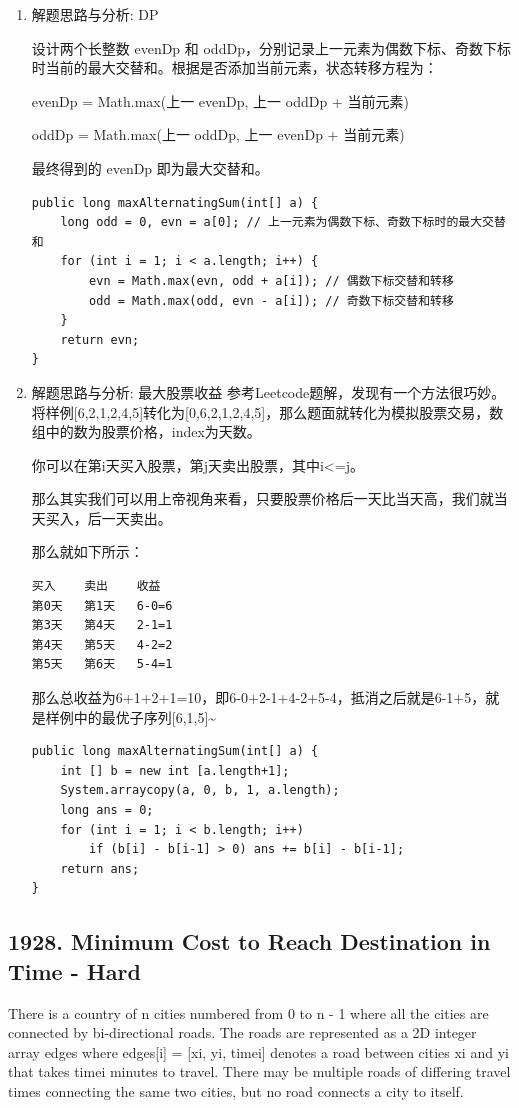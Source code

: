 \documentclass[9pt, b5paaper]{book}
\begin{document}
\begin{enumerate}
\item 解题思路与分析: DP
\label{sec-1-4-9-1}

设计两个长整数 evenDp 和 oddDp，分别记录上一元素为偶数下标、奇数下标时当前的最大交替和。根据是否添加当前元素，状态转移方程为：

evenDp = Math.max(上一 evenDp, 上一 oddDp + 当前元素)

oddDp = Math.max(上一 oddDp, 上一 evenDp + 当前元素)

最终得到的 evenDp 即为最大交替和。

\begin{verbatim}
public long maxAlternatingSum(int[] a) {
    long odd = 0, evn = a[0]; // 上一元素为偶数下标、奇数下标时的最大交替和
    for (int i = 1; i < a.length; i++) {
        evn = Math.max(evn, odd + a[i]); // 偶数下标交替和转移
        odd = Math.max(odd, evn - a[i]); // 奇数下标交替和转移
    }
    return evn;
}
\end{verbatim}
\item 解题思路与分析: 最大股票收益
\label{sec-1-4-9-2}
参考Leetcode题解，发现有一个方法很巧妙。将样例[6,2,1,2,4,5]转化为[0,6,2,1,2,4,5]，那么题面就转化为模拟股票交易，数组中的数为股票价格，index为天数。

你可以在第i天买入股票，第j天卖出股票，其中i<=j。

那么其实我们可以用上帝视角来看，只要股票价格后一天比当天高，我们就当天买入，后一天卖出。

那么就如下所示：
\begin{verbatim}
买入    卖出    收益
第0天   第1天   6-0=6
第3天   第4天   2-1=1
第4天   第5天   4-2=2
第5天   第6天   5-4=1
\end{verbatim}

那么总收益为6+1+2+1=10，即6-0+2-1+4-2+5-4，抵消之后就是6-1+5，就是样例中的最优子序列[6,1,5]\textasciitilde{}
\begin{verbatim}
public long maxAlternatingSum(int[] a) {
    int [] b = new int [a.length+1];
    System.arraycopy(a, 0, b, 1, a.length);
    long ans = 0;
    for (int i = 1; i < b.length; i++) 
        if (b[i] - b[i-1] > 0) ans += b[i] - b[i-1];
    return ans;
}
\end{verbatim}
\end{enumerate}

\subsection{1928. Minimum Cost to Reach Destination in Time - Hard}
\label{sec-1-4-10}
There is a country of n cities numbered from 0 to n - 1 where all the cities are connected by bi-directional roads. The roads are represented as a 2D integer array edges where edges[i] = [xi, yi, timei] denotes a road between cities xi and yi that takes timei minutes to travel. There may be multiple roads of differing travel times connecting the same two cities, but no road connects a city to itself.
\end{document}
